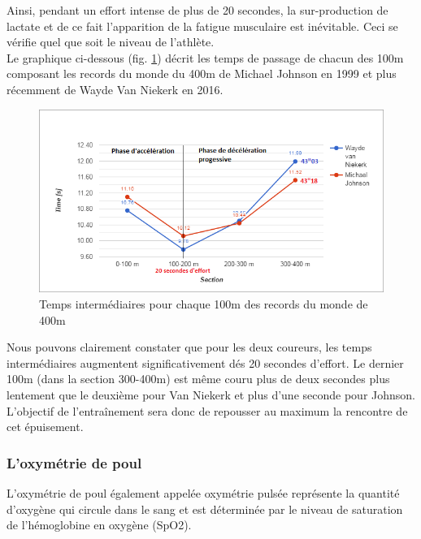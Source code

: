         Ainsi, pendant un effort intense de plus de 20 secondes, la sur-production de lactate et de ce fait l’apparition de la fatigue musculaire est inévitable. Ceci se vérifie quel que soit le niveau de l'athlète.\\
        
        Le graphique ci-dessous (fig. \ref{fig:split_400}) décrit les temps de passage de chacun des 100m composant les records du monde du 400m de Michael Johnson en 1999 et plus récemment de Wayde Van Niekerk en 2016.\\
        
        
        \begin{figure}[H]
            \centering
            \includegraphics[scale=0.85]{images/split-times.png}
            \caption{\label{fig:split_400}Temps intermédiaires pour chaque 100m des records du monde de 400m}
        \end{figure}

        
        Nous pouvons clairement constater que pour les deux coureurs, les temps intermédiaires augmentent significativement dés 20 secondes d'effort. Le dernier 100m (dans la section 300-400m) est même couru plus de deux secondes plus lentement que le deuxième pour Van Niekerk et plus d'une seconde pour Johnson.\\
       
        L'objectif de l'entraînement sera donc de repousser au maximum la rencontre de cet épuisement.\\
        

        \subsubsection{L'oxymétrie de poul}
        \label{oxymetrie}
        
        L'oxymétrie de poul également appelée oxymétrie pulsée représente la quantité d'oxygène qui circule dans le sang et est déterminée par le niveau de saturation de l’hémoglobine en oxygène (SpO2). \\
        
